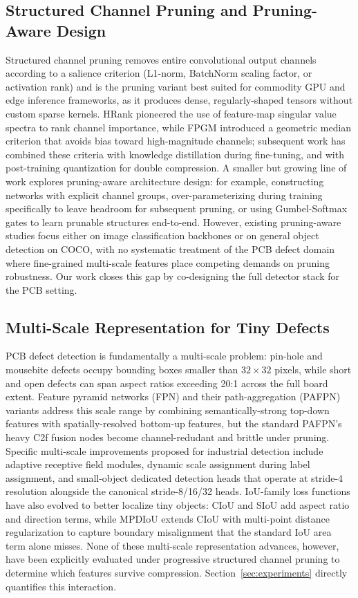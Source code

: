 \documentclass[conference]{IEEEtran}
\providecommand{\DIFadd}[1]{{\protect\color{blue}#1}}
\begin{document}
\subsection{\DIFadd{Structured Channel Pruning and Pruning-Aware Design}}
\DIFadd{Structured channel pruning removes entire convolutional output channels according to a salience criterion (L1-norm, BatchNorm scaling factor, or activation rank) and is the pruning variant best suited for commodity GPU and edge inference frameworks, as it produces dense, regularly-shaped tensors without custom sparse kernels.} \DIFadd{HRank pioneered the use of feature-map singular value spectra to rank channel importance, while FPGM introduced a geometric median criterion that avoids bias toward high-magnitude channels; subsequent work has combined these criteria with knowledge distillation during fine-tuning, and with post-training quantization for double compression.} \DIFadd{A smaller but growing line of work explores pruning-aware architecture design: for example, constructing networks with explicit channel groups, over-parameterizing during training specifically to leave headroom for subsequent pruning, or using Gumbel-Softmax gates to learn prunable structures end-to-end.} \DIFadd{However, existing pruning-aware studies focus either on image classification backbones or on general object detection on COCO, with no systematic treatment of the PCB defect domain where fine-grained multi-scale features place competing demands on pruning robustness.} \DIFadd{Our work closes this gap by co-designing the full detector stack for the PCB setting.}

\subsection{\DIFadd{Multi-Scale Representation for Tiny Defects}}
\DIFadd{PCB defect detection is fundamentally a multi-scale problem: pin-hole and mousebite defects occupy bounding boxes smaller than $32\times32$ pixels, while short and open defects can span aspect ratios exceeding 20:1 across the full board extent.} \DIFadd{Feature pyramid networks (FPN) and their path-aggregation (PAFPN) variants address this scale range by combining semantically-strong top-down features with spatially-resolved bottom-up features, but the standard PAFPN's heavy C2f fusion nodes become channel-redudant and brittle under pruning.} \DIFadd{Specific multi-scale improvements proposed for industrial detection include adaptive receptive field modules, dynamic scale assignment during label assignment, and small-object dedicated detection heads that operate at stride-4 resolution alongside the canonical stride-8/16/32 heads.} \DIFadd{IoU-family loss functions have also evolved to better localize tiny objects: CIoU and SIoU add aspect ratio and direction terms, while MPDIoU extends CIoU with multi-point distance regularization to capture boundary misalignment that the standard IoU area term alone misses.} \DIFadd{None of these multi-scale representation advances, however, have been explicitly evaluated under progressive structured channel pruning to determine which features survive compression.} \DIFadd{Section~\ref{sec:experiments} directly quantifies this interaction.}
\end{document}
